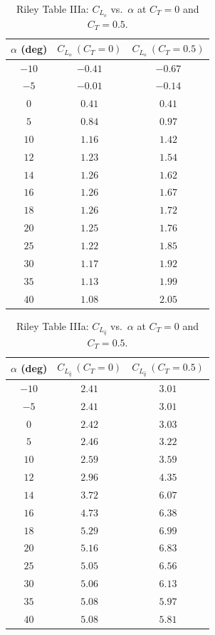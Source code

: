\documentclass[journal ]{new-aiaa}
\begin{document}
\begin{table}[H]
\centering
\caption{Riley Table IIIa: $C_{L_o}$ vs.\ $\alpha$ at $C_T = 0$ and $C_T = 0.5$.}
\label{tab:riley_cl}
\begin{tabular}{ccc}
\toprule
$\alpha$ (deg) & $C_{L_o}\ (C_T{=}0)$ & $C_{L_o}\ (C_T{=}0.5)$ \\
\midrule
$-10$ & $-0.41$ & $-0.67$ \\
$-5$  & $-0.01$ & $-0.14$ \\
$ 0$  & $ 0.41$ & $ 0.41$ \\
$ 5$  & $ 0.84$ & $ 0.97$ \\
$10$  & $ 1.16$ & $ 1.42$ \\
$12$  & $ 1.23$ & $ 1.54$ \\
$14$  & $ 1.26$ & $ 1.62$ \\
$16$  & $ 1.26$ & $ 1.67$ \\
$18$  & $ 1.26$ & $ 1.72$ \\
$20$  & $ 1.25$ & $ 1.76$ \\
$25$  & $ 1.22$ & $ 1.85$ \\
$30$  & $ 1.17$ & $ 1.92$ \\
$35$  & $ 1.13$ & $ 1.99$ \\
$40$  & $ 1.08$ & $ 2.05$ \\
\bottomrule
\end{tabular}
\end{table}

\begin{table}[H]
\centering
\caption{Riley Table IIIa: $C_{L_{\hat{q}}}$ vs.\ $\alpha$ at $C_T = 0$ and $C_T = 0.5$.}
\label{tab:riley_clq}
\begin{tabular}{ccc}
\toprule
$\alpha$ (deg) & $C_{L_{\hat{q}}}\ (C_T{=}0)$ & $C_{L_{\hat{q}}}\ (C_T{=}0.5)$ \\
\midrule
$-10$ & $2.41$ & $3.01$ \\
$-5$  & $2.41$ & $3.01$ \\
$ 0$  & $2.42$ & $3.03$ \\
$ 5$  & $2.46$ & $3.22$ \\
$10$  & $2.59$ & $3.59$ \\
$12$  & $2.96$ & $4.35$ \\
$14$  & $3.72$ & $6.07$ \\
$16$  & $4.73$ & $6.38$ \\
$18$  & $5.29$ & $6.99$ \\
$20$  & $5.16$ & $6.83$ \\
$25$  & $5.05$ & $6.56$ \\
$30$  & $5.06$ & $6.13$ \\
$35$  & $5.08$ & $5.97$ \\
$40$  & $5.08$ & $5.81$ \\
\bottomrule
\end{tabular}
\end{table}
\end{document}
